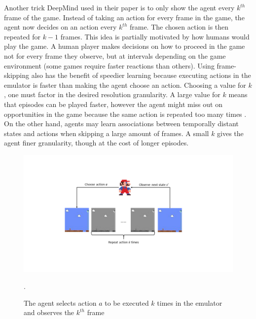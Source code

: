 \documentclass[notitlepage,a4paper,11pt]{article}
\begin{document}
Another trick DeepMind used in their paper is to only show the agent every $k^{th}$ frame of the game. Instead of taking an action for every frame in the game, the agent now decides on an action every $k^{th}$ frame. The chosen action is then repeated for $k-1$ frames. This idea is partially motivated by how humans would play the game. A human player makes decisions on how to proceed in the game not for every frame they observe, but at intervals depending on the game environment (some games require faster reactions than others). Using frame-skipping also has the benefit of speedier learning because executing actions in the emulator is faster than making the agent choose an action. Choosing a value for $k$, one must factor in the desired resolution granularity. A large value for $k$ means that episodes can be played faster, however the agent might miss out on opportunities in the game because the same action is repeated too many times \cite{braylan2015frame}. On the other hand, agents may learn associations between temporally distant states and actions when skipping a large amount of frames. A small $k$ gives the agent finer granularity, though at the cost of longer episodes. 




\begin{figure}[!htb]
\centering
\includegraphics[trim={0 4cm 0 4cm}, clip, width=1\linewidth]{figs/frame_skipping.png}
\caption{The agent selects action $a$ to be executed $k$ times in the emulator and observes the $k^{th}$ frame}.
\end{figure}
\end{document}
